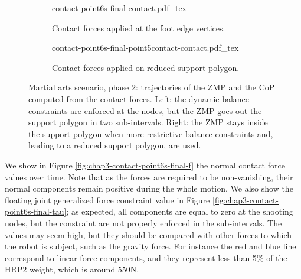 \begin{figure}
  \centering
  \begin{subfigure}{0.49\linewidth}
    \centering
        {\def\svgwidth{\linewidth}
          {\tiny
            
                       {contact-point6s-final-contact.pdf_tex}
          }
        }
        \caption{Contact forces applied at the foot edge vertices.}
        \label{fig:chap3-contact-point6s-final-contact-edge}
  \end{subfigure}
  \begin{subfigure}{0.49\linewidth}
    \centering
        {\def\svgwidth{\linewidth}
          {\tiny
            
                       {contact-point6s-final-point5contact-contact.pdf_tex}
          }
        }
        \caption{Contact forces applied on reduced support polygon.}
        \label{fig:chap3-contact-point6s-final-contact-reduced}
  \end{subfigure}
  \caption{Martial arts scenario, phase 2: trajectories of the ZMP and
    the CoP computed from the contact forces. Left: the dynamic
    balance constraints are enforced at the nodes, but the ZMP goes
    out the support polygon in two sub-intervals. Right: the ZMP stays
    inside the support polygon when more restrictive balance
    constraints and, leading to a reduced support polygon, are used.}
  \label{fig:chap3-contact-point6s-final-contact}
\end{figure}

We show in Figure \ref{fig:chap3-contact-point6s-final-f} the normal
contact force values over time. Note that as the forces are required
to be non-vanishing, their normal components remain positive during
the whole motion. We also show the floating joint generalized force
constraint value in Figure
\ref{fig:chap3-contact-point6s-final-tau}; as expected, all
components are equal to zero at the shooting nodes, but the constraint
are not properly enforced in the sub-intervals. The values may seem
high, but they should be compared with other forces to which the robot
is subject, such as the gravity force. For instance the red and blue
line correspond to linear force components, and they represent less
than 5\% of the HRP2 weight, which is around 550N.

